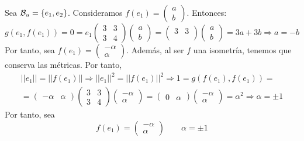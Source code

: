 \begin{ejercicio}
    Sea $\mathcal{B}_u = \{e_1, e_2\}$. Consideramos $f(e_1)=\left(\begin{array}{c}
            a \\ b
        \end{array}\right)$. Entonces:
    \begin{equation*}
        g(e_1, f(e_1)) = 0 = e_1 \left(\begin{array}{cc}
            3 & 3 \\
            3 & 4
        \end{array}\right) \left(\begin{array}{c}
            a \\ b
        \end{array}\right) = \left(\begin{array}{cc}
            3 & 3 \\
        \end{array}\right) \left(\begin{array}{c}
            a \\ b
        \end{array}\right)
        = 3a + 3b \Longrightarrow a=-b
    \end{equation*}
    Por tanto, sea $f(e_1)=\left(\begin{array}{c}
            -\alpha \\ \alpha
        \end{array}\right)$. Además, al ser $f$ una isometría, tenemos que conserva las métricas. Por tanto,
    \begin{multline*}
        ||e_1|| = ||f(e_1)|| \Longrightarrow ||e_1||^2 = ||f(e_1)||^2 \Longrightarrow
        1 = g(f(e_1), f(e_1)) = \\
        = \left(\begin{array}{cc}
            -\alpha & \alpha
        \end{array}\right)
        \left(\begin{array}{cc}
            3 & 3 \\
            3 & 4
        \end{array}\right) \left(\begin{array}{c}
            -\alpha \\ \alpha
        \end{array}\right)
        = \left(\begin{array}{cc}
            0 & \alpha
        \end{array}\right)
        \left(\begin{array}{c}
            -\alpha \\ \alpha
        \end{array}\right) = \alpha^2 \Longrightarrow \alpha = \pm 1
    \end{multline*}
    Por tanto, sea $$f(e_1)=\left(\begin{array}{c}
            -\alpha \\ \alpha
        \end{array}\right) \qquad \alpha = \pm 1$$


\end{ejercicio}
